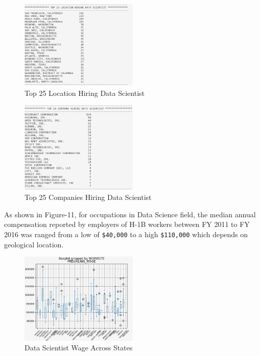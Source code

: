 \documentclass[9pt,twocolumn,twoside]{../../styles/osajnl}
\begin{document}
\begin{figure}[H]
  \centering
  \includegraphics[width=0.5\textwidth]{images/image12}  
   \vspace{-1em}
  \caption{Top 25 Location Hiring Data Scientist}
   \vspace{-1em}
  \end{figure}

\begin{figure}[H]
  \centering
  \includegraphics[width=0.5\textwidth]{images/image15}
     \vspace{-1em}
  \caption{Top 25 Companies Hiring Data Scientist}
     \vspace{-1em}
  \end{figure}
  

As shown in Figure-11, for occupations in Data Science field, the median annual compensation reported by employers of H-1B workers  between FY 2011 to FY 2016 was ranged from a low of \verb|$40,000| to  a high \verb|$110,000| which depends on geological location. 

\begin{figure}[H]
  \centering
  \includegraphics[width=0.5\textwidth]{images/image16} 
    \vspace{-1em}
  \caption{Data Scientist Wage Across States}
    \vspace{-1em}
  \end{figure}
\end{document}
